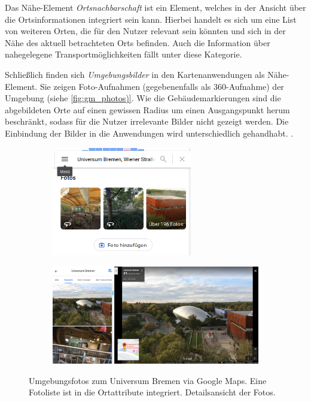Das Nähe-Element \emph{Ortsnachbarschaft} ist ein Element, welches in der Ansicht über die Ortsinformationen integriert sein kann.
Hierbei handelt es sich um eine List von weiteren Orten, die für den Nutzer relevant sein könnten und sich in der Nähe des aktuell betrachteten Orts befinden.
Auch die Information über nahegelegene Transportmöglichkeiten fällt unter diese Kategorie.

Schließlich finden sich \emph{Umgebungsbilder} in den Kartenanwendungen als Nähe-Element.
Sie zeigen Foto-Aufnahmen (gegebenenfalls als 360\textdegree-Aufnahme) der Umgebung (siehe \autoref{fig:gm_photos)}.
Wie die Gebäudemarkierungen sind die abgebildeten Orte auf einen gewissen Radius um einen Ausgangspunkt herum beschränkt, sodass für die Nutzer irrelevante Bilder nicht gezeigt werden.
Die Einbindung der Bilder in die Anwendungen wird unterschiedlich gehandhabt.
.

\begin{figure}
	\begin{subfigure}[t]{0.3\linewidth}
		\centering
		\vspace{0pt}
		\includegraphics[width=\linewidth, height=4.75cm, keepaspectratio=false]{figures/map-app_examples/gm_photos_1}
		\caption{}
		\label{sfig:gm_photos_1}
	\end{subfigure}
	\hfill
	\begin{subfigure}[t]{0.7\linewidth}
		\centering
		\vspace{0pt}
		\includegraphics[width=\linewidth]{figures/map-app_examples/gm_photos_2}
		\caption{}
		\label{sfig:gm_photos_2}
	\end{subfigure}
	\caption{Umgebungsfotos zum Universum Bremen via Google Maps. %
	 Eine Fotoliste ist in die Ortattribute integriert. %
	 Detailsansicht der Fotos.}
	\label{fig:gm_photos}
\end{figure}


